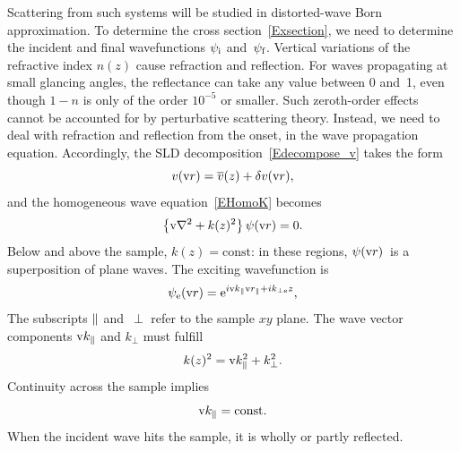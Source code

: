 Scattering from such systems will be studied in distorted-wave Born approximation.
To determine the cross section~\cref{Exsection},
we need to determine the incident and final wavefunctions
$\psi_\si$ and~$\psi_\sf$.
Vertical variations of the refractive index $n(z)$
%
cause refraction and reflection.
%
%
%
For waves propagating at small glancing angles,
the reflectance can take any value between 0 and~1,
even though $1-n$ is only of the order $10^{-5}$ or smaller.
Such zeroth-order effects cannot be accounted for
by perturbative scattering theory.
Instead, we need to deal with refraction and reflection
from the onset, in the wave propagation equation.
Accordingly, the SLD decomposition~\cref{Edecompose_v} takes the form
\begin{equation}\label{Edecompose_vz}
  v(\r) = \mv(z) + \delta v(\r),
\end{equation}
and the homogeneous wave equation~\cref{EHomoK} becomes
\begin{equation}\label{EWaveZ}
  \left\{\Nabla^2+k(z)^2\right\}\psi(\r) = 0.
\end{equation}
Below and above the sample,
$k(z)=\text{const}$:
in these regions, $\psi(\r)$~is a superposition of plane waves.
The exciting wavefunction is
%
%
\begin{equation}\label{Epsiminus}
  \psi_\se(\r) = \e^{i\k_\plll\r_\plll+ik_{\perp\se}z},
\end{equation}
%
%
%
%
The subscripts $\plll$ and~$\perp$ refer to the sample $xy$ plane.
The wave vector components $\k_\plll$ and $k_{\perp}$ must fulfill
\begin{equation}
  k(z)^2=\k_\plll^2+k_{\perp}^2.
\end{equation}
%
%
Continuity across the sample implies
\begin{equation}\label{Ekconst}
  \k_\plll = \text{const}.
\end{equation}
%
%
When the incident wave hits the sample,
it is wholly or partly reflected.
